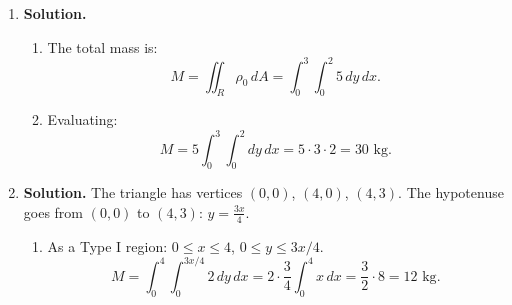 \begin{enumerate}
\begin{enumerate}
The line $y=2-x$ lies inside the circle (since at the midpoint $(1,1)$, $1+1=2<4$). So the region between the line (below) and the arc (above) is one piece, plus the triangular region below the line.

The region is bounded by all four curves simultaneously. The simplest interpretation: $R$ is the region in the first quadrant that is inside the circle and above the line $y=2-x$---the region between the chord and the arc.

Alternatively, $R$ could be the region below both the circle and the line. Let us take $R$ as the region with $x\ge 0$, $y\ge 0$, $x^2+y^2\le 4$, and $y\le 2-x$ (the triangular region under the chord). In that case, $R$ is a triangle with vertices $(0,0)$, $(2,0)$, $(0,2)$.

For the more interesting case where $R$ is between the chord and the arc: $x\ge 0$, $y\ge 0$, $x^2+y^2\le 4$, $y\ge 2-x$:

\item \textbf{Split approach:} Use polar coordinates for the circular part. In polar, the circle is $r=2$ and the line $x+y=2$ becomes $r(\cos\theta+\sin\theta)=2$, i.e., $r = \frac{2}{\cos\theta+\sin\theta}$.

The full integral over $R$ (between chord and arc):
\[
\iint_R(x+y)\,dA = \int_0^{\pi/2}\int_{2/(\cos\theta+\sin\theta)}^{2}(r\cos\theta+r\sin\theta)\,r\,dr\,d\theta
\]
\[
= \int_0^{\pi/2}\int_{2/(\cos\theta+\sin\theta)}^{2}r^2(\cos\theta+\sin\theta)\,dr\,d\theta.
\]
This is a clean single integral in polar coordinates.
\end{enumerate}

\item \textbf{Solution.}
\begin{enumerate}
\item The total mass is:
\[
M = \iint_R \rho_0\,dA = \int_0^3\int_0^2 5\,dy\,dx.
\]

\item Evaluating:
\[
M = 5\int_0^3\int_0^2 dy\,dx = 5\cdot 3\cdot 2 = \boxed{30\text{ kg}}.
\]
\end{enumerate}

\item \textbf{Solution.}
The triangle has vertices $(0,0)$, $(4,0)$, $(4,3)$. The hypotenuse goes from $(0,0)$ to $(4,3)$: $y = \frac{3x}{4}$.

\begin{enumerate}
\item As a Type I region: $0\le x\le 4$, $0\le y\le 3x/4$.
\[
M = \int_0^4\int_0^{3x/4}2\,dy\,dx = 2\cdot\frac{3}{4}\int_0^4 x\,dx = \frac{3}{2}\cdot 8 = \boxed{12\text{ kg}}.
\]


\end{enumerate}
\end{enumerate}
